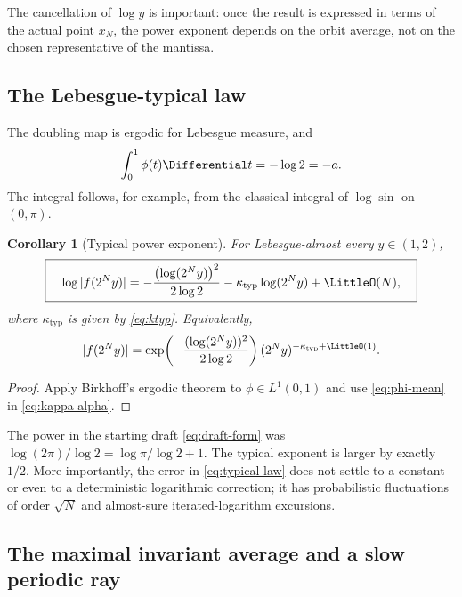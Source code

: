 \documentclass[11pt,oneside]{article}
\newtheorem{corollary}[theorem]{Corollary}
\theoremstyle{definition}
\theoremstyle{remark}
\begin{document}
The cancellation of $\log y$ is important: once the result is expressed in
terms of the actual point $x_N$, the power exponent depends on the orbit
average, not on the chosen representative of the mantissa.

\subsection{The Lebesgue-typical law}

The doubling map is ergodic for Lebesgue measure, and
\begin{equation}
 \int_0^1\phi(t)\Differential t=-\log2=-a.                            \label{eq:phi-mean}
\end{equation}
The integral follows, for example, from the classical integral of
$\log\sin$ on $(0,\pi)$.

\begin{corollary}[Typical power exponent]
For Lebesgue-almost every $y\in(1,2)$,
\begin{equation}
 \boxed{\quad
 \log|f(2^Ny)|
 =-\frac{\bigl(\log(2^Ny)\bigr)^2}{2\log2}
 -\kappa_{\mathrm{typ}}\log(2^Ny)+\LittleO(N),
 \quad}                                                     \label{eq:typical-law}
\end{equation}
where $\kappa_{\mathrm{typ}}$ is given by \eqref{eq:ktyp}.  Equivalently,
\begin{equation}
 |f(2^Ny)|
 =\exp\!\left(-\frac{(\log(2^Ny))^2}{2\log2}\right)
 (2^Ny)^{-\kappa_{\mathrm{typ}}+\LittleO(1)}.               \label{eq:typical-multiplicative}
\end{equation}
\end{corollary}

\begin{proof}
Apply Birkhoff's ergodic theorem to $\phi\in L^1(0,1)$ and use
\eqref{eq:phi-mean} in \cref{eq:kappa-alpha}.
\end{proof}

The power in the starting draft \eqref{eq:draft-form} was
$\log(2\pi)/\log2=\log\pi/\log2+1$.  The typical exponent is larger by exactly
$1/2$.  More importantly, the error in \eqref{eq:typical-law} does not settle
to a constant or even to a deterministic logarithmic correction; it has
probabilistic fluctuations of order $\sqrt N$ and almost-sure iterated-logarithm
excursions.

\subsection{The maximal invariant average and a slow periodic ray}
\end{document}
